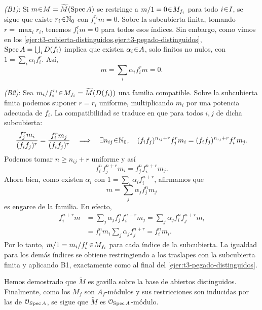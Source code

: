 \begin{sol}
\medskip
\noindent\emph{(B1)}: Si $m\en M=\widetilde M(\Spec A)$ se restringe a $m/1=0\en M_{f_i}$ para todo $i\en I$, se sigue que existe $r_i\en\mathbb N_0$ con $f_i^{r_i}m=0$. Sobre la subcubierta finita, tomando $r=\max_i r_i$, tenemos $f_i^r m=0$ para todos esos índices. Sin embargo, como vimos en los \cref{ejer:t3-cubierta-distinguidos,ejer:t3-pegado-distinguidos}, $\operatorname{Spec} A=\bigcup_iD(f_i)$ implica que existen $\alpha_i\en A$, solo finitos no nulos, con $1=\sum_i\alpha_i f_i^r$. Así,
\[
m=\sum_i\alpha_i f_i^r m=0.
\]

\medskip
\noindent\emph{(B2)}: Sea $m_i/f_i^{r_i}\en M_{f_i}=\widetilde M(D(f_i))$ una familia compatible. Sobre la subcubierta finita podemos suponer $r=r_i$ uniforme, multiplicando $m_i$ por una potencia adecuada de $f_i$. La compatibilidad se traduce en que para todos $i,j$ de dicha subcubierta:
\[
\frac{f_j^r m_i}{(f_i f_j)^r}=\frac{f_i^r m_j}{(f_i f_j)^r}
\quad\Longrightarrow\quad
\exists n_{ij}\en\mathbb N_0,\quad
(f_i f_j)^{n_{ij}+r}f_j^r m_i=(f_i f_j)^{n_{ij}+r}f_i^r m_j.
\]
Podemos tomar $n\ge n_{ij}+r$ uniforme y así
\[
f_i^n f_j^{n+r}m_i=f_j^n f_i^{n+r}m_j.
\]
Ahora bien, como existen $\alpha_i$ con $1=\sum_i\alpha_i f_i^{n+r}$, afirmamos que
\[
m=\sum_j\alpha_j f_j^n m_j
\]
es engarce de la familia. En efecto,
\[
\begin{aligned}
f_i^{n+r}m
&=\sum_j\alpha_j f_j^n f_i^{n+r}m_j
=\sum_j\alpha_j f_i^n f_j^{n+r}m_i\\
&=f_i^n m_i\sum_j\alpha_j f_j^{n+r}=f_i^n m_i.
\end{aligned}
\]
Por lo tanto, $m/1=m_i/f_i^r\en M_{f_i}$ para cada índice de la subcubierta. La igualdad para los demás índices se obtiene restringiendo a los traslapes con la subcubierta finita y aplicando B1, exactamente como al final del \cref{ejer:t3-pegado-distinguidos}.

Hemos demostrado que $\widetilde M$ es gavilla sobre la base de abiertos distinguidos. Finalmente, como los $M_f$ son $A_f$-módulos y sus restricciones son inducidas por las de $\mathcal O_{\operatorname{Spec} A}$, se sigue que $\widetilde M$ es $\mathcal O_{\operatorname{Spec} A}$-módulo.
\end{sol}
